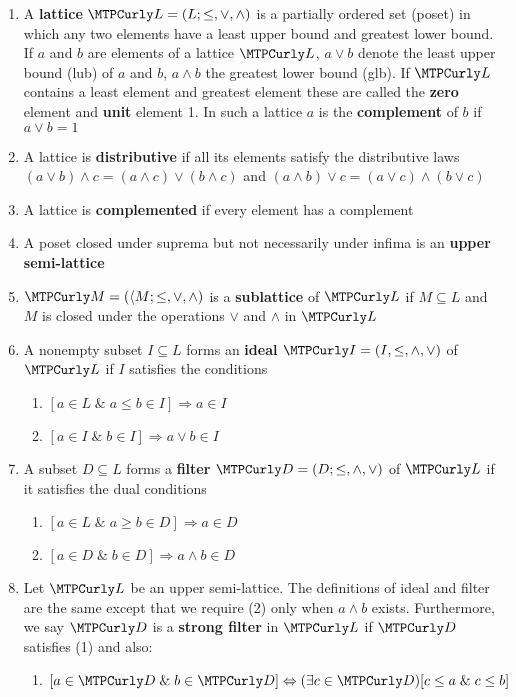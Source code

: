 \documentclass[11pt]{article}
\begin{document}
\begin{definition}[]
\begin{enumerate}
\item A \textbf{lattice} \(\call=(L;\le,\vee,\wedge)\) is a partially ordered set
(poset) in which any two elements have a least upper bound and greatest
lower bound. If \(a\) and \(b\) are elements of a lattice \(\call\),
\(a\vee b\) denote the least upper bound (lub) of \(a\) and \(b\),
\(a\wedge b\) the greatest lower bound (glb). If \(\call\) contains a
least element and greatest element these are called the \textbf{zero} element and
\textbf{unit} element 1. In such a lattice \(a\) is the \textbf{complement} of \(b\) if
\(a\vee b=1\)
\item A lattice is \textbf{distributive} if all its elements satisfy the distributive
laws
\((a\vee b)\wedge c=(a\wedge c)\vee(b\wedge c)\) and
\((a\wedge b)\vee c=(a\vee c)\wedge(b\vee c)\)
\item A lattice is \textbf{complemented} if every element has a complement
\item A poset closed under suprema but not necessarily under infima is an
\textbf{upper semi-lattice}
\item \(\calm=(\la M;\le,\vee,\wedge)\) is a \textbf{sublattice} of \(\call\) if
\(M\subseteq L\) and \(M\) is closed under the operations \(\vee\) and
\(\wedge\) in \(\call\)
\item A nonempty subset \(I\subseteq L\) forms an \textbf{ideal}
\(\cali=(I,\le,\wedge,\vee)\) of \(\call\) if \(I\) satisfies the
conditions
\begin{enumerate}
\item \([a\in L\;\&\;a\le b\in I]\Longrightarrow a\in I\)
\item \([a\in I\;\&\;b\in I]\Longrightarrow a\vee b\in I\)
\end{enumerate}
\item A subset \(D\subseteq L\) forms a \textbf{filter} \(\cald=(D;\le,\wedge,\vee)\)
of \(\call\) if it satisfies the dual conditions
\begin{enumerate}
\item \([a\in L\;\&\; a\ge b\in D]\Longrightarrow a\in D\)
\item \([a\in D\;\&\; b\in D]\Longrightarrow a\wedge b\in D\)
\end{enumerate}
\item Let \(\call\) be an upper semi-lattice. The definitions of ideal and
filter are the same except that we require (2) only when \(a\wedge b\)
exists. Furthermore, we say \(\cald\) is a \textbf{strong filter} in \(\call\) if
\(\cald\) satisfies (1) and also:
\begin{enumerate}
\item \([a\in\cald\;\&\;b\in\cald]\Leftrightarrow(\exists c\in\cald)
         [c\le a\;\&\;c\le b]\)
\end{enumerate}
\end{enumerate}
\end{definition}
\end{document}
